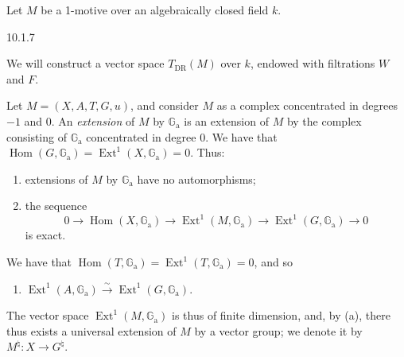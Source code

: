   Let \(M\) be a 1-motive over an algebraically closed field \(k\).\begin{construction}{10.1.7}\label{hodge-theory-iii-10.1.7}\skipsinglepar\par{}We will construct a vector space \(T_\mathrm {DR}(M)\) over \(k\), endowed with filtrations \(W\) and \(F\).\par{}Let \(M=(X,A,T,G,u)\), and consider \(M\) as a complex concentrated in degrees \(-1\) and \(0\).
    An \emph{extension} of \(M\) by \(\mathbb {G}_\mathrm {a}\) is an extension of \(M\) by the complex consisting of \(\mathbb {G}_\mathrm {a}\) concentrated in degree \(0\).
    We have that \(\operatorname {Hom}(G,\mathbb {G}_\mathrm {a})=\operatorname {Ext}^1(X,\mathbb {G}_\mathrm {a})=0\).
    Thus:

    
 \begin{enumerate}
      
 \item[(a)]
        extensions of \(M\) by \(\mathbb {G}_\mathrm {a}\) have no automorphisms;
      

      
 \item[(b)]
        the sequence
        \[           0           \to  \operatorname {Hom}(X,\mathbb {G}_\mathrm {a})           \to  \operatorname {Ext}^1(M,\mathbb {G}_\mathrm {a})           \to  \operatorname {Ext}^1(G,\mathbb {G}_\mathrm {a})           \to  0         \]
        is exact.
      

    \end{enumerate}


    We have that \(\operatorname {Hom}(T,\mathbb {G}_\mathrm {a})=\operatorname {Ext}^1(T,\mathbb {G}_\mathrm {a})=0\), and so

    
 \begin{enumerate}
      
 \item[(c)]
        \(\operatorname {Ext}^1(A,\mathbb {G}_\mathrm {a})\xrightarrow {\sim }\operatorname {Ext}^1(G,\mathbb {G}_\mathrm {a})\).
      

    \end{enumerate}\par{}The vector space \(\operatorname {Ext}^1(M,\mathbb {G}_\mathrm {a})\) is thus of finite dimension, and, by (a), there thus exists a universal extension of \(M\) by a vector group;
    we denote it by \(M^\natural \colon  X\to  G^\natural \).


\end{construction}
